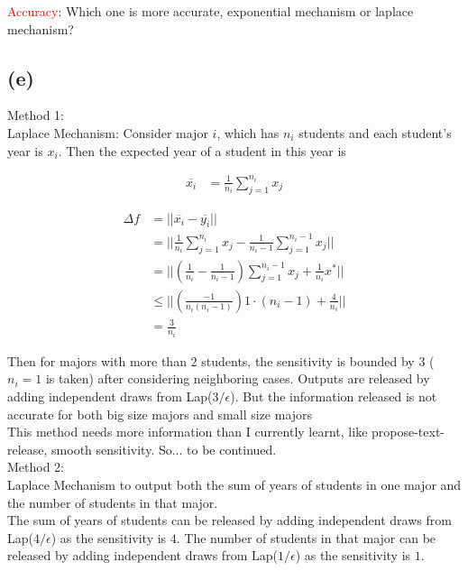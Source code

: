\documentclass{article}
\begin{document}
\textcolor{red}{Accuracy}: Which one is more accurate, exponential mechanism or laplace mechanism? \\



\subsection*{(e)}
Method 1:\\
Laplace Mechanism:
Consider major $i$, which has $n_i$ students and each student's year is $x_i$. Then the expected year of a student in this year is

\begin{align*}
\overline{x_i} &= \frac{1}{n_i} \sum_{j=1}^{n_i}x_j
\end{align*}

\begin{align*}
\Delta f &= || \overline{x_i} - \overline{y_i} ||\\
&= || \frac{1}{n_i} \sum_{j=1}^{n_i}x_j  -  \frac{1}{n_i-1} \sum_{j=1}^{n_i-1}x_j||\\
&= ||\left(\frac{1}{n_i} -  \frac{1}{n_i-1}\right) \sum_{j=1}^{n_i-1}x_j +\frac{1}{n_i} x^{*}||\\
&\leq ||\left(\frac{-1}{n_i(n_i-1)}\right) 1\cdot (n_i-1) +  \frac{4}{n_i}||\\
&= \frac{3}{n_i}
\end{align*}

Then for majors with more than $2$ students, the sensitivity is bounded by $3$ ($n_i = 1$ is taken) after considering neighboring cases. Outputs are released by adding independent draws from Lap($3/\epsilon$). But the information released is not accurate for both big size majors and small size majors\\

This method needs more information than I currently learnt, like propose-text-release, smooth sensitivity. So... to be continued.\\

Method 2:\\
Laplace Mechanism to output both the sum of years of students in one major and the number of students in that major.\\

The sum of years of students can be released by adding independent draws from Lap($4/\epsilon$) as the sensitivity is $4$. The number of students in that major can be released by adding independent draws from Lap($1/\epsilon$) as the sensitivity is $1$. \\
\end{document}
